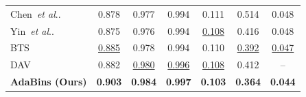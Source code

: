 \documentclass{vip-theme}
\makeatletter
\DeclareRobustCommand\onedot{\futurelet\@let@token\@onedot}
\def\@onedot{\ifx\@let@token.\else.\null\fi\xspace}
\def\etal{\emph{et al}\onedot}
\makeatother
\begin{document}
\begin{table}[!htbp]
\begin{tabularx}{\linewidth}{@{}l*{5}{C}c@{}}
Chen~\etal                                                      & 0.878          & 0.977          & 0.994          & 0.111            & 0.514          &  0.048              \\ 
Yin~\etal                                                             & 0.875          & 0.976          & 0.994          & \underline{0.108}            & 0.416          & 0.048               \\ 
BTS~                                                              & \underline{0.885}          & 0.978          & 0.994          & 0.110            & \underline{0.392}          & \underline{0.047}          \\ 
DAV                                                              & 0.882          & \underline{0.980}          & \underline{0.996} & \underline{0.108}            & 0.412          & --              \\ 
\midrule

\textbf{AdaBins (Ours)} & \textbf{0.903} & \textbf{0.984} & \textbf{0.997} & \textbf{0.103}     & \textbf{0.364} & \textbf{0.044} \\ 
\bottomrule
\end{tabularx}
\label{tab:results-nyu}
\end{table}
\end{document}
